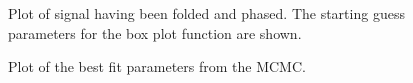 \documentclass[twocolumn,11pt]{article}
\begin{document}
\begin{figure}[!h]
	\centering
	\noindent
      \caption{Plot of signal having been folded and phased. The starting guess parameters for the box plot function are shown.}
\end{figure}

\begin{figure}[!h]
	\centering
	\noindent
      \caption{Plot of the best fit parameters from the MCMC.}
\end{figure}
\end{document}
